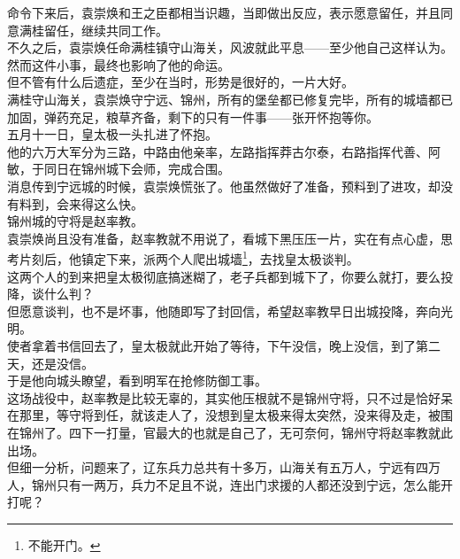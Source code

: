 \begin{multicols}{\theparacolNo}
命令下来后，袁崇焕和王之臣都相当识趣，当即做出反应，表示愿意留任，并且同意满桂留任，继续共同工作。\\

不久之后，袁崇焕任命满桂镇守山海关，风波就此平息——至少他自己这样认为。\\

然而这件小事，最终也影响了他的命运。\\

但不管有什么后遗症，至少在当时，形势是很好的，一片大好。\\

满桂守山海关，袁崇焕守宁远、锦州，所有的堡垒都已修复完毕，所有的城墙都已加固，弹药充足，粮草齐备，剩下的只有一件事——张开怀抱等你。\\

五月十一日，皇太极一头扎进了怀抱。\\

他的六万大军分为三路，中路由他亲率，左路指挥莽古尔泰，右路指挥代善、阿敏，于同日在锦州城下会师，完成合围。\\

消息传到宁远城的时候，袁崇焕慌张了。他虽然做好了准备，预料到了进攻，却没有料到，会来得这么快。\\

锦州城的守将是赵率教。\\

袁崇焕尚且没有准备，赵率教就不用说了，看城下黑压压一片，实在有点心虚，思考片刻后，他镇定下来，派两个人爬出城墙\footnote{不能开门。}，去找皇太极谈判。\\

这两个人的到来把皇太极彻底搞迷糊了，老子兵都到城下了，你要么就打，要么投降，谈什么判？\\

但愿意谈判，也不是坏事，他随即写了封回信，希望赵率教早日出城投降，奔向光明。\\

使者拿着书信回去了，皇太极就此开始了等待，下午没信，晚上没信，到了第二天，还是没信。\\

于是他向城头瞭望，看到明军在抢修防御工事。\\

这场战役中，赵率教是比较无辜的，其实他压根就不是锦州守将，只不过是恰好呆在那里，等守将到任，就该走人了，没想到皇太极来得太突然，没来得及走，被围在锦州了。四下一打量，官最大的也就是自己了，无可奈何，锦州守将赵率教就此出场。\\

但细一分析，问题来了，辽东兵力总共有十多万，山海关有五万人，宁远有四万人，锦州只有一两万，兵力不足且不说，连出门求援的人都还没到宁远，怎么能开打呢？\\


\end{multicols}
